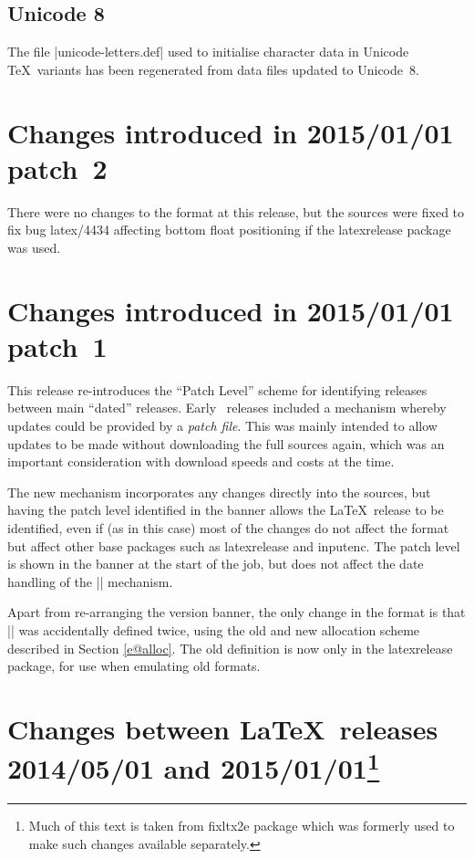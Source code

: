 \documentclass{ltxguide}
\newcommand\Lpack[1]{\mbox{\textsf{#1}}}
\begin{document}
\subsection{Unicode 8}
The file |unicode-letters.def| used to initialise character data in
Unicode \TeX\ variants has been regenerated from data files updated
to Unicode~8.

\section{Changes  introduced in 2015/01/01 patch~2}
There were no changes to the format at this release, but the sources were fixed to fix bug latex/4434
affecting bottom float positioning if the \Lpack{latexrelease} package was used.

\section{Changes  introduced in 2015/01/01 patch~1}
This release re-introduces the ``Patch Level'' scheme for identifying
releases between main ``dated'' releases. Early \LaTeXe\ releases
included a mechanism whereby updates could be provided by a 
\emph{patch
  file}. This was mainly intended to allow updates to be made without
downloading the full sources again, which was an important
consideration with download speeds and costs at the time.

The new mechanism incorporates any changes directly into the sources,
but having the patch level identified in the banner allows the
\LaTeX\ release to be identified, even if (as in this case) most of the
changes do not affect the format but affect other base packages such
as \Lpack{latexrelease} and \Lpack{inputenc}. The patch level is shown
in the banner at the start of the job, but does not affect the date
handling of the |\IncludeInRelease| mechanism.

Apart from re-arranging the version banner, the only change in the
format is that |\newtoks| was accidentally defined twice, using the
old and new allocation scheme described in Section \ref{e@alloc}.
The old definition is now only in the \Lpack{latexrelease} package,
for use when emulating old formats.




\section
[Changes between  \LaTeX\ releases 2014/05/01 and 2015/01/01]
{Changes between \LaTeX\ releases 2014/05/01 and 2015/01/01\footnote{Much of this text
is taken from \Lpack{fixltx2e} package which was formerly used to make such changes available separately.}}
\end{document}
